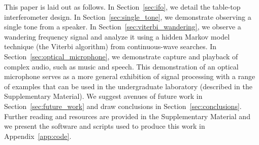 \documentclass[paper-main.tex]{subfiles}
\begin{document}
This paper is laid out as follows. 
In Section~\ref{sec:ifo}, we detail the table-top interferometer design. 
In Section~\ref{sec:single_tone}, we demonstrate observing a single tone from a speaker. 
In Section~\ref{sec:viterbi_wandering}, we observe a wandering frequency signal and analyze it using a hidden Markov model technique (the Viterbi algorithm) from continuous-wave searches. 
In Section~\ref{sec:optical_microphone}, we demonstrate capture and playback of complex audio, such as music and speech.
This demonstration of an optical microphone serves as a more general exhibition of signal processing with a range of examples that can be used in the undergraduate laboratory (described in the Supplementary Material). %
We suggest avenues of future work in Section~\ref{sec:future_work} and draw conclusions in Section~\ref{sec:conclusions}. 
Further reading and resources are provided in the Supplementary Material and we present the software and scripts used to produce this work in Appendix~\ref{app:code}.
\end{document}
